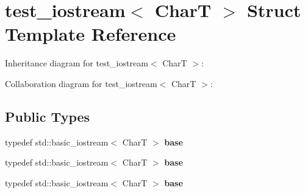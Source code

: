\hypertarget{structtest__iostream}{}\section{test\+\_\+iostream$<$ CharT $>$ Struct Template Reference}
\label{structtest__iostream}


Inheritance diagram for test\+\_\+iostream$<$ CharT $>$\+:


Collaboration diagram for test\+\_\+iostream$<$ CharT $>$\+:
\subsection*{Public Types}
\begin{DoxyCompactItemize}
\item 
\mbox{\label{structtest__iostream_a2051926497404ccea996ceb2747ad270}} 
typedef std\+::basic\+\_\+iostream$<$ CharT $>$ {\bfseries base}
\item 
\mbox{\label{structtest__iostream_a2051926497404ccea996ceb2747ad270}} 
typedef std\+::basic\+\_\+iostream$<$ CharT $>$ {\bfseries base}
\item 
\mbox{\label{structtest__iostream_a2051926497404ccea996ceb2747ad270}} 
typedef std\+::basic\+\_\+iostream$<$ CharT $>$ {\bfseries base}
\end{DoxyCompactItemize}

